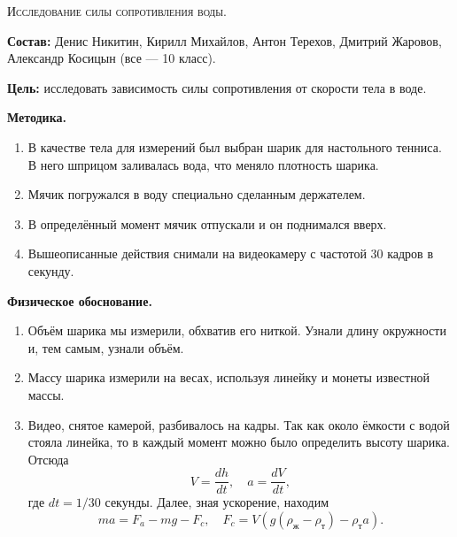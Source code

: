 \begin{center}
  \textsc{Исследование силы сопротивления воды.}
\end{center}

\textbf{Состав:} Денис Никитин, Кирилл Михайлов, Антон Терехов,
Дмитрий Жаровов, Александр Косицын (все --- 10 класс). 

\textbf{Цель:} исследовать зависимость силы сопротивления от скорости
тела в воде. 

\begin{center}
  \textbf{Методика.}  
\end{center}

\begin{enumerate}
\item В качестве тела для измерений был выбран шарик для настольного
  тенниса. В него шприцом заливалась вода, что меняло плотность
  шарика.
\item Мячик погружался в воду специально сделанным держателем.
\item В определённый момент мячик отпускали и он поднимался вверх.
\item Вышеописанные действия снимали на видеокамеру с частотой 30
  кадров в секунду. 
\end{enumerate}

\begin{center}
  \textbf{Физическое обоснование.}
\end{center}

\begin{enumerate}
\item Объём шарика мы измерили, обхватив его ниткой. Узнали длину
  окружности и, тем самым, узнали объём.
\item Массу шарика измерили на весах, используя линейку и монеты
  известной массы.
\item Видео, снятое камерой, разбивалось на кадры. Так как около
  ёмкости с водой стояла линейка, то в каждый момент можно было
  определить высоту шарика. Отсюда
  \begin{equation}
    \label{eq:bz_1}
    V = \frac{dh}{dt}, \quad a = \frac{dV}{dt},
  \end{equation}
  где $dt = 1/30$ секунды. Далее, зная ускорение, находим
  \begin{equation}
    \label{eq:bz_2}
    ma = F_a - mg - F_c, \quad F_c = V (g (\rho_{\mbox{ж}} -
    \rho_{\mbox{т}}) - \rho_{\mbox{т}} a). 
  \end{equation}
\end{enumerate}

